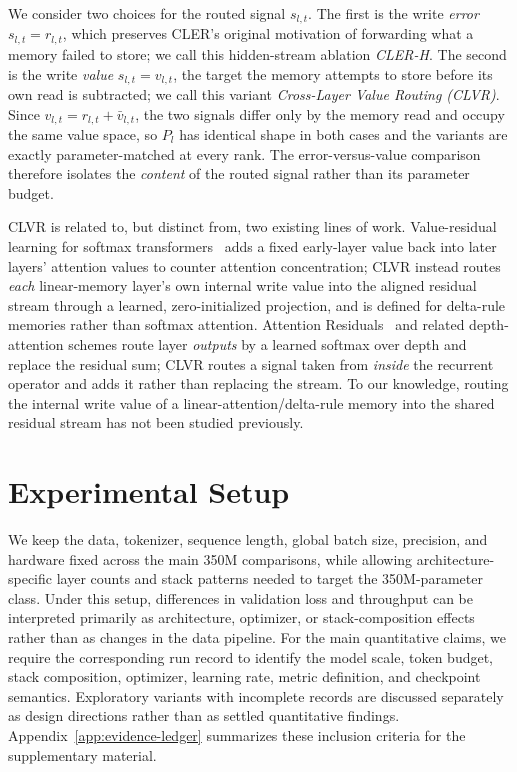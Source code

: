 \documentclass{article}
\begin{document}
We consider two choices for the routed signal $s_{l,t}$. The first is the write \emph{error} $s_{l,t}=r_{l,t}$, which preserves CLER's original motivation of forwarding what a memory failed to store; we call this hidden-stream ablation \emph{CLER-H}. The second is the write \emph{value} $s_{l,t}=v_{l,t}$, the target the memory attempts to store before its own read is subtracted; we call this variant \emph{Cross-Layer Value Routing (CLVR)}. Since $v_{l,t}=r_{l,t}+\bar v_{l,t}$, the two signals differ only by the memory read and occupy the same value space, so $P_l$ has identical shape in both cases and the variants are exactly parameter-matched at every rank. The error-versus-value comparison therefore isolates the \emph{content} of the routed signal rather than its parameter budget.

CLVR is related to, but distinct from, two existing lines of work. Value-residual learning for softmax transformers~\cite{value_residual_learning} adds a fixed early-layer value back into later layers' attention values to counter attention concentration; CLVR instead routes \emph{each} linear-memory layer's own internal write value into the aligned residual stream through a learned, zero-initialized projection, and is defined for delta-rule memories rather than softmax attention. Attention Residuals~\cite{attention_residuals} and related depth-attention schemes route layer \emph{outputs} by a learned softmax over depth and replace the residual sum; CLVR routes a signal taken from \emph{inside} the recurrent operator and adds it rather than replacing the stream. To our knowledge, routing the internal write value of a linear-attention/delta-rule memory into the shared residual stream has not been studied previously.

\section{Experimental Setup}
\label{sec:experiments}

We keep the data, tokenizer, sequence length, global batch size, precision, and hardware fixed across the main 350M comparisons, while allowing architecture-specific layer counts and stack patterns needed to target the 350M-parameter class. Under this setup, differences in validation loss and throughput can be interpreted primarily as architecture, optimizer, or stack-composition effects rather than as changes in the data pipeline. For the main quantitative claims, we require the corresponding run record to identify the model scale, token budget, stack composition, optimizer, learning rate, metric definition, and checkpoint semantics. Exploratory variants with incomplete records are discussed separately as design directions rather than as settled quantitative findings. Appendix~\ref{app:evidence-ledger} summarizes these inclusion criteria for the supplementary material.
\end{document}
